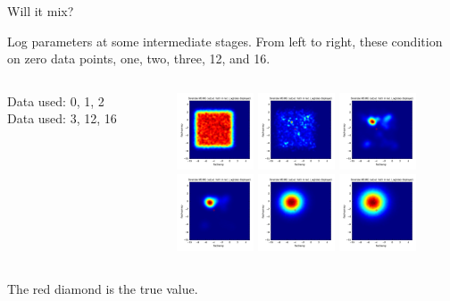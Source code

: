 \documentclass[12pt,a4paper,t,xcolor=dvipsnames,slidestop,compress,mathserif]{beamer}
\begin{document}
\begin{frame}{Will it mix?}

Log parameters at some intermediate stages.  From left to right, these condition on zero data points, one, two, three, 12, and 16.

\begin{columns}[c]
\begin{column}{0.17\textwidth}

Data used: 0, 1, 2\\
\phantom{0}
Data used: 3, 12, 16\\

\end{column}
\begin{column}{0.80\textwidth}

\includegraphics[height=0.9in,width=0.9in]{large_bw_million/dist1_contour_flacherep_flacheunrep.png}
\includegraphics[height=0.9in,width=0.9in]{large_bw_million/dist2_contour_flacherep_flacheunrep.png}
\includegraphics[height=0.9in,width=0.9in]{large_bw_million/dist3_contour_flacherep_flacheunrep.png}\\
\includegraphics[height=0.9in,width=0.9in]{large_bw_million/dist4_contour_flacherep_flacheunrep.png}
\includegraphics[height=0.9in,width=0.9in]{large_bw_million/dist13_contour_flacherep_flacheunrep.png}
\includegraphics[height=0.9in,width=0.9in]{large_bw_million/dist17_contour_flacherep_flacheunrep.png}\\

\end{column}
\end{columns}
 The red diamond is the true value.
\end{frame}
\end{document}
